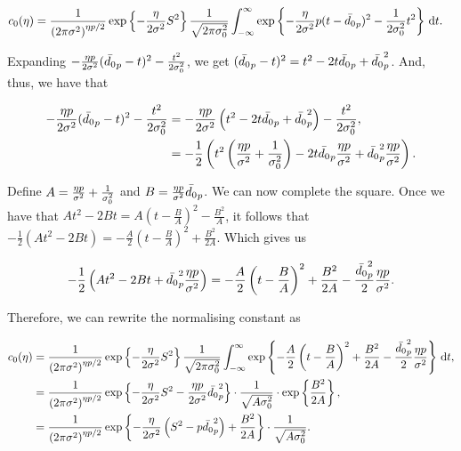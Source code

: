     \begin{align*}
        c_0(\eta) &= \dfrac{1}{{(2\pi\sigma^2)}^{\eta p/2}}\exp\left\{-\dfrac{\eta}{2\sigma^2}S^2\right\} \dfrac{1}{\sqrt{2\pi\sigma_0^2}} \int_{-\infty}^{\infty}\exp\left\{-\dfrac{\eta}{2\sigma^2}p(t- \bar{d_0}_p)^2 -\dfrac{1}{2\sigma_0^2}t^2 \right\} \, \dd t.
    \end{align*}

    Expanding $-\frac{\eta p}{2\sigma^2} (\bar{d_0}_p - t)^2 - \frac{t^2}{2\sigma_0^2}$, we get $(\bar{d_0}_p - t)^2 = t^2 - 2t\bar{d_0}_p + \bar{d_0}_p^2$. And, thus, we have that

    \begin{align*}
        -\frac{\eta p}{2\sigma^2} (\bar{d_0}_p - t)^2 - \frac{t^2}{2\sigma_0^2} &=
        -\frac{\eta p}{2\sigma^2}\left(t^2 - 2t\bar{d_0}_p + \bar{d_0}_p^2\right) - \frac{t^2}{2\sigma_0^2},\\
        &= - \dfrac{1}{2}\left(t^2 \left(\dfrac{\eta p}{\sigma^2} + \dfrac{1}{\sigma_0^2}\right) - 2t\bar{d_0}_p\dfrac{\eta p}{\sigma^2} + \bar{d_0}_p^2 \dfrac{\eta p}{\sigma^2}\right).
    \end{align*}

    Define $A = \frac{\eta p}{\sigma^2} + \frac{1}{\sigma_0^2}$ and $B = \frac{\eta p}{\sigma^2}\bar{d_0}_p$. We can now complete the square. Once we have that $A t^2 - 2Bt = A \left( t - \frac{B}{A} \right)^2 - \frac{B^2}{A}$, it follows that $ -\frac{1}{2} (A t^2 - 2Bt) = -\frac{A}{2}\left( t - \frac{B}{A} \right)^2 + \frac{B^2}{2A}$. Which gives us

    \begin{equation*}
        -\dfrac{1}{2} \left( A t^2 - 2Bt + \bar{d_0}_p^2 \dfrac{\eta p}{\sigma^2} \right) = -\dfrac{A}{2}\left( t - \dfrac{B}{A} \right)^2 + \dfrac{B^2}{2A} - \dfrac{\bar{d_0}_p^2}{2}\dfrac{\eta p}{\sigma^2}.
    \end{equation*}

    Therefore, we can rewrite the normalising constant as

    \begin{align*}
        c_0(\eta) &= \dfrac{1}{{(2\pi\sigma^2)}^{\eta p/2}}\exp\left\{-\dfrac{\eta}{2\sigma^2}S^2\right\} \dfrac{1}{\sqrt{2\pi\sigma_0^2}} \int_{-\infty}^{\infty}\exp\left\{-\dfrac{A}{2}\left( t - \dfrac{B}{A} \right)^2 + \dfrac{B^2}{2A} - \dfrac{\bar{d_0}_p^2}{2}\dfrac{\eta p}{\sigma^2}\right\} \, \dd t, \\
        &= \dfrac{1}{{(2\pi\sigma^2)}^{\eta p/2}}\exp\left\{-\dfrac{\eta}{2\sigma^2}S^2 - \dfrac{\eta p}{2\sigma^2}\bar{d_0}_p^2\right\} \cdot \dfrac{1}{\sqrt{A\sigma_0^2}} \cdot \exp\left\{\dfrac{B^2}{2A}\right\}, \\
        &= \dfrac{1}{{(2\pi\sigma^2)}^{\eta p/2}}\exp\left\{-\dfrac{\eta}{2\sigma^2}\left(S^2 - p\bar{d_0}_p^2\right) + \dfrac{B^2}{2A}\right\} \cdot \dfrac{1}{\sqrt{A\sigma_0^2}}.
    \end{align*}

